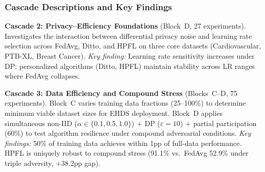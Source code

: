 \documentclass[conference]{IEEEtran}
\begin{document}
\begin{table}[htbp]
\centering
\caption{Clinical Dataset Portfolio for FL-EHDS Evaluation}
\label{tab:dataset_portfolio}
\end{table}

\subsubsection{Cascade Descriptions and Key Findings}

\noindent\textbf{Cascade 2: Privacy--Efficiency Foundations} (Block~D, 27 experiments). Investigates the interaction between differential privacy noise and learning rate selection across FedAvg, Ditto, and HPFL on three core datasets (Cardiovascular, PTB-XL, Breast Cancer). \textit{Key finding:} Learning rate sensitivity increases under DP; personalized algorithms (Ditto, HPFL) maintain stability across LR ranges where FedAvg collapses.

\smallskip\noindent\textbf{Cascade 3: Data Efficiency and Compound Stress} (Blocks~C--D, 75 experiments). Block~C varies training data fractions (25--100\%) to determine minimum viable dataset sizes for EHDS deployment. Block~D applies simultaneous non-IID ($\alpha \in \{0.1, 0.5, 1.0\}$) + DP ($\varepsilon{=}10$) + partial participation (60\%) to test algorithm resilience under compound adversarial conditions. \textit{Key findings:} 50\% of training data achieves within 1pp of full-data performance. HPFL is uniquely robust to compound stress (91.1\% vs.\ FedAvg 52.9\% under triple adversity, $+$38.2pp gap).
\end{document}
